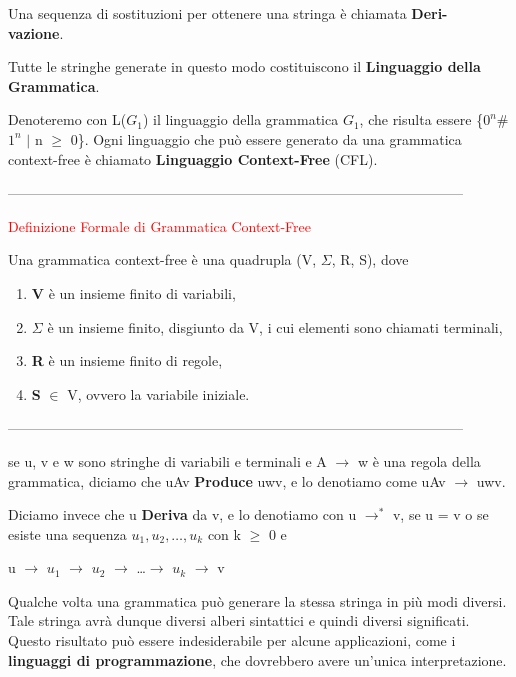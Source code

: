 \documentclass{article}
\begin{document}
Una sequenza di sostituzioni per ottenere una stringa è chiamata \textbf{Deri-
\\ vazione}.

Tutte le stringhe generate in questo modo costituiscono il \textbf{Linguaggio
della Grammatica}.

Denoteremo con L($G_1$) il linguaggio della grammatica $G_1$, che risulta essere
\{$0^n$\#$1^n$ $|$ n $\geq$ 0\}. Ogni linguaggio che può essere generato da una
grammatica context-free è chiamato \textbf{Linguaggio Context-Free} (CFL).

--------------------------------------------------------------------------------------------------

\begin{center}
    \textcolor{red}{Definizione Formale di Grammatica Context-Free}
\end{center}

Una grammatica context-free è una quadrupla (V, $\Sigma$, R, S), dove

\begin{enumerate}
    \item \textbf{V} è un insieme finito di variabili,
    \item \textbf{$\Sigma$} è un insieme finito, disgiunto da V, i cui elementi
    sono chiamati terminali,
    \item \textbf{R} è un insieme finito di regole,
    \item \textbf{S} $\in$ V, ovvero la variabile iniziale.
\end{enumerate}

--------------------------------------------------------------------------------------------------

se u, v e w sono stringhe di variabili e terminali e A $\rightarrow$ w è una
regola della grammatica, diciamo che uAv \textbf{Produce} uwv, e lo denotiamo
come uAv $\rightarrow$ uwv. 

Diciamo invece che u \textbf{Deriva} da v, e lo denotiamo con u $\rightarrow^*$
v, se u = v o se esiste una sequenza $u_1,u_2,\ldots ,u_k$ con k $\geq$ 0 e

\begin{center}
    u $\rightarrow$ $u_1$ $\rightarrow$ $u_2$ $\rightarrow$ \ldots $\rightarrow$
    $u_k$ $\rightarrow$ v
\end{center}

Qualche volta una grammatica può generare la stessa stringa in più modi diversi.
Tale stringa avrà dunque diversi alberi sintattici e quindi diversi significati.
Questo risultato può essere indesiderabile per alcune applicazioni, come i
\textbf{linguaggi di programmazione}, che dovrebbero avere un'unica
interpretazione. 
\end{document}
